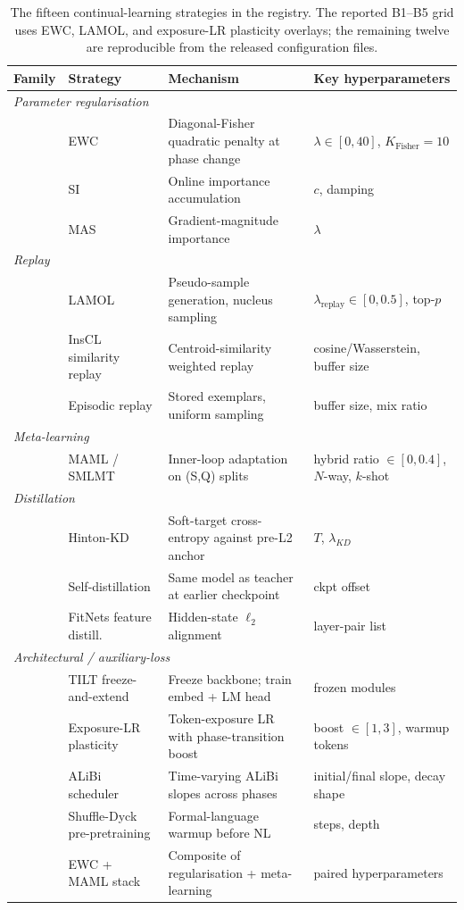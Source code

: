 \begin{table}[t]
\centering
\small
\setlength{\tabcolsep}{3.5pt}
\begin{tabular}{llll}
\toprule
\textbf{Family} & \textbf{Strategy} & \textbf{Mechanism} & \textbf{Key hyperparameters} \\
\midrule
\multicolumn{4}{l}{\textit{Parameter regularisation}} \\
& EWC \citep{kirkpatrick2017overcoming} & Diagonal-Fisher quadratic penalty at phase change & $\lambda\in[0,40]$, $K_{\text{Fisher}}=10$ \\
& SI & Online importance accumulation & $c$, damping \\
& MAS & Gradient-magnitude importance & $\lambda$ \\
\midrule
\multicolumn{4}{l}{\textit{Replay}} \\
& LAMOL \citep{sun2020lamol} & Pseudo-sample generation, nucleus sampling & $\lambda_{\text{replay}}\in[0,0.5]$, top-$p$ \\
& InsCL similarity replay & Centroid-similarity weighted replay & cosine/Wasserstein, buffer size \\
& Episodic replay & Stored exemplars, uniform sampling & buffer size, mix ratio \\
\midrule
\multicolumn{4}{l}{\textit{Meta-learning}} \\
& MAML / SMLMT & Inner-loop adaptation on (S,Q) splits & hybrid ratio $\in[0,0.4]$, $N$-way, $k$-shot \\
\midrule
\multicolumn{4}{l}{\textit{Distillation}} \\
& Hinton-KD & Soft-target cross-entropy against pre-L2 anchor & $T$, $\lambda_{KD}$ \\
& Self-distillation & Same model as teacher at earlier checkpoint & ckpt offset \\
& FitNets feature distill. & Hidden-state $\ell_2$ alignment & layer-pair list \\
\midrule
\multicolumn{4}{l}{\textit{Architectural / auxiliary-loss}} \\
& TILT freeze-and-extend & Freeze backbone; train embed + LM head & frozen modules \\
& Exposure-LR plasticity & Token-exposure LR with phase-transition boost & boost $\in[1,3]$, warmup tokens \\
& ALiBi scheduler & Time-varying ALiBi slopes across phases & initial/final slope, decay shape \\
& Shuffle-Dyck pre-pretraining & Formal-language warmup before NL & steps, depth \\
& EWC + MAML stack & Composite of regularisation + meta-learning & paired hyperparameters \\
\bottomrule
\end{tabular}
\caption{The fifteen continual-learning strategies in the \beetle{} registry. The reported B1--B5 grid uses EWC, LAMOL, and exposure-LR plasticity overlays; the remaining twelve are reproducible from the released configuration files.}
\label{tab:cl-registry}
\end{table}
 
